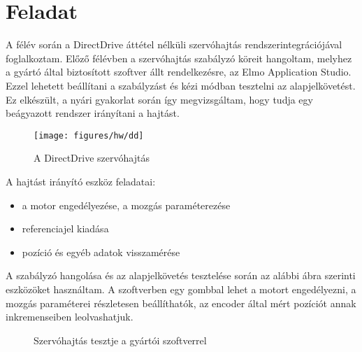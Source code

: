 \section*{Feladat}

A félév során a DirectDrive áttétel nélküli szervóhajtás rendszerintegrációjával foglalkoztam. Előző félévben a szervóhajtás szabályzó köreit hangoltam, melyhez a gyártó által biztosított szoftver állt rendelkezésre, az Elmo Application Studio. Ezzel lehetett beállítani a szabályzást és kézi módban tesztelni az alapjelkövetést. Ez elkészült, a nyári gyakorlat során így megvizsgáltam, hogy tudja egy beágyazott rendszer irányítani a hajtást.  

\begin{figure}[H]
	\centering
	\centering
	\texttt{[image: figures/hw/dd]}
	\caption{A DirectDrive szervóhajtás}
	\label{fig:dd}
\end{figure}


A hajtást irányító eszköz feladatai:
\begin{itemize}[noitemsep,topsep=-8pt,parsep=0pt,partopsep=-6pt]
	\item a motor engedélyezése, a mozgás paraméterezése
	\item referenciajel kiadása
	\item pozíció és egyéb adatok visszamérése
\end{itemize}

A szabályzó hangolása és az alapjelkövetés tesztelése során az alábbi ábra szerinti eszközöket használtam. A szoftverben egy gombbal lehet a motort engedélyezni, a mozgás paraméterei részletesen beállíthatók, az encoder által mért pozíciót annak inkremenseiben leolvashatjuk. 

\begin{figure}[H]
	\centering
	
	\label{fig:control}
	\caption{Szervóhajtás tesztje a gyártói szoftverrel}
\end{figure}



